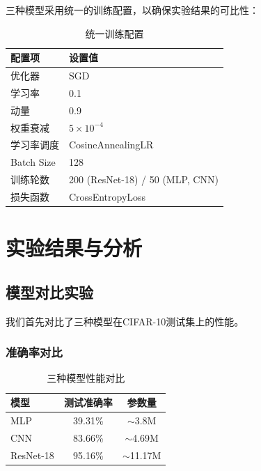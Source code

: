 \documentclass[12pt,a4paper]{article}
\begin{document}
三种模型采用统一的训练配置，以确保实验结果的可比性：

\begin{table}[H]
    \centering
    \caption{统一训练配置}
    \label{tab:training_config}
    \begin{tabular}{ll}
        \toprule
        \textbf{配置项} & \textbf{设置值} \\
        \midrule
        优化器 & SGD \\
        学习率 & 0.1 \\
        动量 & 0.9 \\
        权重衰减 & $5 \times 10^{-4}$ \\
        学习率调度 & CosineAnnealingLR \\
        Batch Size & 128 \\
        训练轮数 & 200 (ResNet-18) / 50 (MLP, CNN) \\
        损失函数 & CrossEntropyLoss \\
        \bottomrule
    \end{tabular}
\end{table}

\section{实验结果与分析}

\subsection{模型对比实验}

我们首先对比了三种模型在CIFAR-10测试集上的性能。

\subsubsection{准确率对比}

\begin{table}[H]
    \centering
    \caption{三种模型性能对比}
    \label{tab:model_comparison}
    \begin{tabular}{lcc}
        \toprule
        \textbf{模型} & \textbf{测试准确率} & \textbf{参数量} \\
        \midrule
        MLP & 39.31\% & $\sim$3.8M \\
        CNN & 83.66\% & $\sim$4.69M \\
        ResNet-18 & 95.16\% & $\sim$11.17M \\
        \bottomrule
    \end{tabular}
\end{table}
\end{document}
